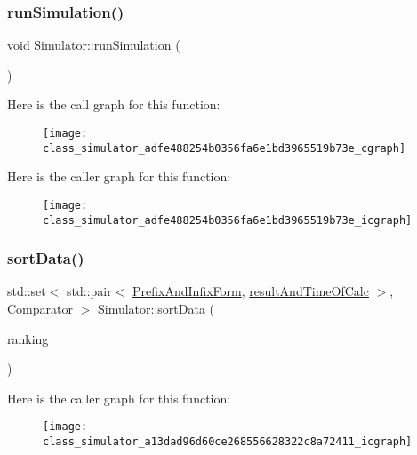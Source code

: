 \subsubsection{\texorpdfstring{runSimulation()}{runSimulation()}}
{\footnotesize\ttfamily void Simulator\+::run\+Simulation (\begin{DoxyParamCaption}{ }\end{DoxyParamCaption})}

Here is the call graph for this function\+:
\nopagebreak
\begin{figure}[H]
\begin{center}
\leavevmode
\texttt{[image: class\_simulator\_adfe488254b0356fa6e1bd3965519b73e\_cgraph]}
\end{center}
\end{figure}
Here is the caller graph for this function\+:
\nopagebreak
\begin{figure}[H]
\begin{center}
\leavevmode
\texttt{[image: class\_simulator\_adfe488254b0356fa6e1bd3965519b73e\_icgraph]}
\end{center}
\end{figure}
\mbox{\label{class_simulator_a13dad96d60ce268556628322c8a72411}} 
\subsubsection{\texorpdfstring{sortData()}{sortData()}}
{\footnotesize\ttfamily std\+::set$<$ std\+::pair$<$ \mbox{\hyperlink{_simulator_8h_a93155c36d2ca378f207952fa62a0af6a}{Prefix\+And\+Infix\+Form}}, \mbox{\hyperlink{_simulator_8h_a0b2d4926f4b800d184280526d83a2a25}{result\+And\+Time\+Of\+Calc}} $>$, \mbox{\hyperlink{_simulator_8h_ae3c01f820fe5764de14452addf221c60}{Comparator}} $>$ Simulator\+::sort\+Data (\begin{DoxyParamCaption}\item[{std\+::map$<$ \mbox{\hyperlink{_simulator_8h_a93155c36d2ca378f207952fa62a0af6a}{Prefix\+And\+Infix\+Form}}, \mbox{\hyperlink{_simulator_8h_a0b2d4926f4b800d184280526d83a2a25}{result\+And\+Time\+Of\+Calc}} $>$}]{ranking }\end{DoxyParamCaption})}

Here is the caller graph for this function\+:
\nopagebreak
\begin{figure}[H]
\begin{center}
\leavevmode
\texttt{[image: class\_simulator\_a13dad96d60ce268556628322c8a72411\_icgraph]}
\end{center}
\end{figure}
\mbox{\label{class_simulator_abc52b83e17d25101a8ddd2f2215352d5}} 
